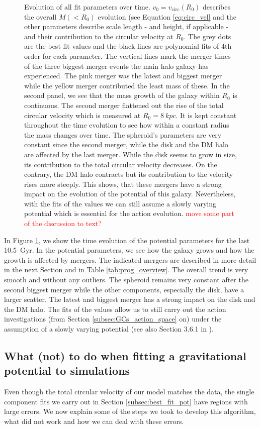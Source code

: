 \begin{figure}
\caption{Evolution of all fit parameters over time. $v_0 = v_\mathrm{circ}(R_0)$ describes the overall $M(<R_0)$ evolution (see Equation \ref{eq:circ_vel} and the other parameters describe scale length - and height, if applicable - and their contribution to the circular velocity at $R_0$. The grey dots are the best fit values and the black lines are polynomial fits of 4th order for each parameter. The vertical lines mark the merger times of the three biggest merger events the main halo galaxy has experienced. The pink merger was the latest and biggest merger while the yellow merger contributed the least mass of these. In the second panel, we see that the mass growth of the galaxy within $R_0$ is continuous. The second merger flattened out the rise of the total circular velocity which is measured at $R_0 = \SI{8}{kpc}$. It is kept constant throughout the time evolution to see how within a constant radius the mass changes over time. The spheroid's parameters are very constant since the second merger, while the disk and the \ac{DM} halo are affected by the last merger. While the disk seems to grow in size, its contribution to the total circular velocity decreases. On the contrary, the \ac{DM} halo contracts but its contribution to the velocity rises more steeply. This shows, that these mergers have a strong impact on the evolution of the potential of this galaxy. Nevertheless, with the fits of the values we can still assume a slowly varying potential which is essential for the action evolution. \textcolor{red}{move some part of the discussion to text?}}\label{fig:pot_val_evol}
\end{figure}
In Figure \ref{fig:pot_val_evol}, we show the time evolution of the potential parameters for the last \SI{10.5}{Gyr}. In the potential parameters, we see how the galaxy grows and how the growth is affected by mergers. The indicated mergers are described in more detail in the next Section and in Table \ref{tab:prog_overview}. The overall trend is very smooth and without any outliers. The spheroid remains very constant after the second biggest merger while the other components, especially the disk, have a larger scatter. The latest and biggest merger has a strong impact on the disk and the \ac{DM} halo. The fits of the values allow us to still carry out the action investigations (from Section \ref{subsec:GCs_action_space} on) under the assumption of a slowly varying potential (see also Section 3.6.1 in \citealp{Binney...Tremaine...2008}). 

\subsection{What (not) to do when fitting a gravitational potential to simulations}\label{subsec:wrong_pot_fit}
Even though the total circular velocity of our model matches the data, the single component fits we carry out in Section \ref{subsec:best_fit_pot} have regions with large errors. We now explain some of the steps we took to develop this algorithm, what did not work and how we can deal with these errors.

